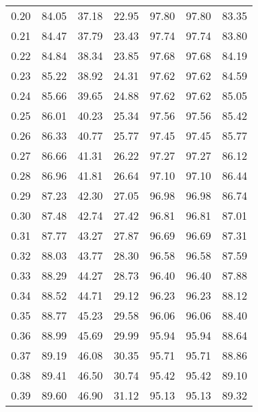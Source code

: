 \begin{tabular}{|c|c|c|c|c|c|c|}
      0.20 &     84.05 &     37.18 &      22.95 &   97.80 &      97.80 &         83.35 \\
      0.21 &     84.47 &     37.79 &      23.43 &   97.74 &      97.74 &         83.80 \\
      0.22 &     84.84 &     38.34 &      23.85 &   97.68 &      97.68 &         84.19 \\
      0.23 &     85.22 &     38.92 &      24.31 &   97.62 &      97.62 &         84.59 \\
      0.24 &     85.66 &     39.65 &      24.88 &   97.62 &      97.62 &         85.05 \\
      0.25 &     86.01 &     40.23 &      25.34 &   97.56 &      97.56 &         85.42 \\
      0.26 &     86.33 &     40.77 &      25.77 &   97.45 &      97.45 &         85.77 \\
      0.27 &     86.66 &     41.31 &      26.22 &   97.27 &      97.27 &         86.12 \\
      0.28 &     86.96 &     41.81 &      26.64 &   97.10 &      97.10 &         86.44 \\
      0.29 &     87.23 &     42.30 &      27.05 &   96.98 &      96.98 &         86.74 \\
      0.30 &     87.48 &     42.74 &      27.42 &   96.81 &      96.81 &         87.01 \\
      0.31 &     87.77 &     43.27 &      27.87 &   96.69 &      96.69 &         87.31 \\
      0.32 &     88.03 &     43.77 &      28.30 &   96.58 &      96.58 &         87.59 \\
      0.33 &     88.29 &     44.27 &      28.73 &   96.40 &      96.40 &         87.88 \\
      0.34 &     88.52 &     44.71 &      29.12 &   96.23 &      96.23 &         88.12 \\
      0.35 &     88.77 &     45.23 &      29.58 &   96.06 &      96.06 &         88.40 \\
      0.36 &     88.99 &     45.69 &      29.99 &   95.94 &      95.94 &         88.64 \\
      0.37 &     89.19 &     46.08 &      30.35 &   95.71 &      95.71 &         88.86 \\
      0.38 &     89.41 &     46.50 &      30.74 &   95.42 &      95.42 &         89.10 \\
      0.39 &     89.60 &     46.90 &      31.12 &   95.13 &      95.13 &         89.32 \\

\end{tabular}
